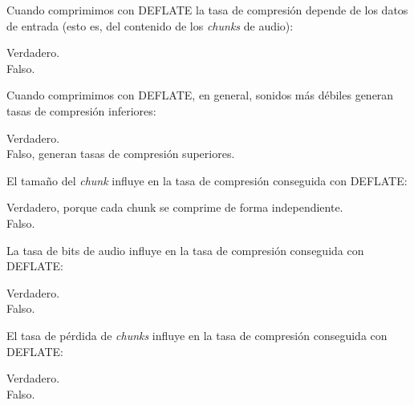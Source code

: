 \documentclass[legalpaper, 12pt, addpoints]{exam}
\begin{document}
\begin{questions}
\vspace{0.10in}

\question Cuando comprimimos con DEFLATE la tasa de compresión depende
de los datos de entrada (esto es, del contenido de los \emph{chunks} de
audio):

\begin{oneparchoices}
  \choice Verdadero.\\
  \choice Falso.
\end{oneparchoices}
  
\vspace{0.10in}

\question Cuando comprimimos con DEFLATE, en general, sonidos más débiles generan tasas de compresión inferiores:

\begin{oneparchoices}
  \choice Verdadero.\\
  \choice Falso, generan tasas de compresión superiores.
\end{oneparchoices}
  
\vspace{0.10in}

\question El tamaño del \emph{chunk} influye en la tasa de compresión conseguida con DEFLATE:

\begin{oneparchoices}
  \choice Verdadero, porque cada chunk se comprime de forma independiente.\\
  \choice Falso.
\end{oneparchoices}
  
\vspace{0.10in}

\question La tasa de bits de audio influye en la tasa de compresión conseguida con DEFLATE:

\begin{oneparchoices}
  \choice Verdadero.\\
  \choice Falso.
\end{oneparchoices}
  
\vspace{0.10in}

\question El tasa de pérdida de \emph{chunks} influye en la tasa de compresión conseguida con DEFLATE:

\begin{oneparchoices}
  \choice Verdadero.\\
  \choice Falso.
\end{oneparchoices}
  
\vspace{0.10in}


\end{questions}
\end{document}

